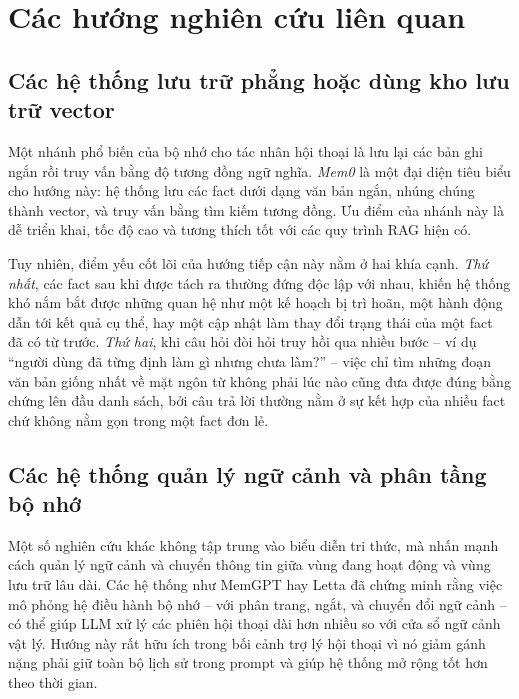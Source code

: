 \documentclass[../main.tex]{subfiles}
\begin{document}
\section{Các hướng nghiên cứu liên quan}

\subsection{Các hệ thống lưu trữ phẳng hoặc dùng kho lưu trữ vector}

Một nhánh phổ biến của bộ nhớ cho tác nhân hội thoại là lưu lại các bản ghi ngắn rồi truy vấn bằng độ tương đồng ngữ nghĩa. \textit{Mem0} là một đại diện tiêu biểu cho hướng này: hệ thống lưu các fact dưới dạng văn bản ngắn, nhúng chúng thành vector, và truy vấn bằng tìm kiếm tương đồng. Ưu điểm của nhánh này là dễ triển khai, tốc độ cao và tương thích tốt với các quy trình RAG hiện có.

Tuy nhiên, điểm yếu cốt lõi của hướng tiếp cận này nằm ở hai khía cạnh. \textit{Thứ nhất}, các fact sau khi được tách ra thường đứng độc lập với nhau, khiến hệ thống khó nắm bắt được những quan hệ như một kế hoạch bị trì hoãn, một hành động dẫn tới kết quả cụ thể, hay một cập nhật làm thay đổi trạng thái của một fact đã có từ trước. \textit{Thứ hai}, khi câu hỏi đòi hỏi truy hồi qua nhiều bước -- ví dụ ``người dùng đã từng định làm gì nhưng chưa làm?'' -- việc chỉ tìm những đoạn văn bản giống nhất về mặt ngôn từ không phải lúc nào cũng đưa được đúng bằng chứng lên đầu danh sách, bởi câu trả lời thường nằm ở sự kết hợp của nhiều fact chứ không nằm gọn trong một fact đơn lẻ.

\subsection{Các hệ thống quản lý ngữ cảnh và phân tầng bộ nhớ}

Một số nghiên cứu khác không tập trung vào biểu diễn tri thức, mà nhấn mạnh cách quản lý ngữ cảnh và chuyển thông tin giữa vùng đang hoạt động và vùng lưu trữ lâu dài. Các hệ thống như MemGPT hay Letta đã chứng minh rằng việc mô phỏng hệ điều hành bộ nhớ -- với phân trang, ngắt, và chuyển đổi ngữ cảnh -- có thể giúp LLM xử lý các phiên hội thoại dài hơn nhiều so với cửa sổ ngữ cảnh vật lý. Hướng này rất hữu ích trong bối cảnh trợ lý hội thoại vì nó giảm gánh nặng phải giữ toàn bộ lịch sử trong prompt và giúp hệ thống mở rộng tốt hơn theo thời gian.
\end{document}
